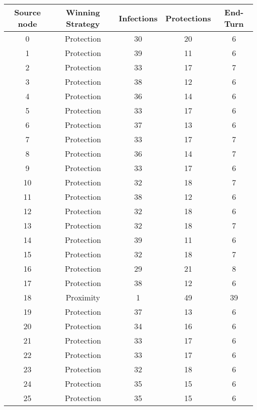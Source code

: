 \documentclass[results.tex]{subfiles}
\begin{document}
\begin{center}
  \begin{tabular}{| c || c | c | c | c |}
    \hline
    {\bfseries Source node} & {\bfseries Winning Strategy} & {\bfseries Infections} & {\bfseries Protections} & {\bfseries End-Turn} \\  %
    \hline\hline
    0 & Protection & 30 & 20 & 6 \\ 
    \hline
    1 & Protection & 39 & 11 & 6 \\ 
    \hline
    2 & Protection & 33 & 17 & 7 \\ 
    \hline
    3 & Protection & 38 & 12 & 6 \\ 
    \hline
    4 & Protection & 36 & 14 & 6 \\ 
    \hline
    5 & Protection & 33 & 17 & 6 \\ 
    \hline
    6 & Protection & 37 & 13 & 6 \\ 
    \hline
    7 & Protection & 33 & 17 & 7 \\ 
    \hline
    8 & Protection & 36 & 14 & 7 \\ 
    \hline
    9 & Protection & 33 & 17 & 6 \\ 
    \hline
    10 & Protection & 32 & 18 & 7 \\ 
    \hline
    11 & Protection & 38 & 12 & 6 \\ 
    \hline
    12 & Protection & 32 & 18 & 6 \\ 
    \hline
    13 & Protection & 32 & 18 & 7 \\ 
    \hline
    14 & Protection & 39 & 11 & 6 \\ 
    \hline
    15 & Protection & 32 & 18 & 7 \\ 
    \hline
    16 & Protection & 29 & 21 & 8 \\ 
    \hline
    17 & Protection & 38 & 12 & 6 \\ 
    \hline
    18 & Proximity & 1 & 49 & 39 \\ 
    \hline
    19 & Protection & 37 & 13 & 6 \\ 
    \hline
    20 & Protection & 34 & 16 & 6 \\ 
    \hline
    21 & Protection & 33 & 17 & 6 \\ 
    \hline
    22 & Protection & 33 & 17 & 6 \\ 
    \hline
    23 & Protection & 32 & 18 & 6 \\ 
    \hline
    24 & Protection & 35 & 15 & 6 \\ 
    \hline
    25 & Protection & 35 & 15 & 6 \\ 

\end{tabular}
\end{center}
\end{document}
